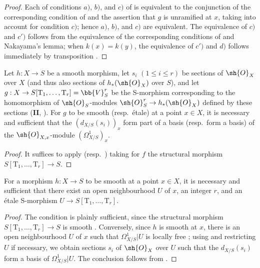\begin{proof}
Each of conditions $a)$, $b)$, and $c)$ of  is equivalent to the conjunction of the corresponding condition of  and the assertion that $g$ is unramified at $x$, taking  into account for condition $c)$; hence $a)$, $b)$, and $c)$ are equivalent.
The equivalence of $c)$ and $c')$ follows from the equivalence of the corresponding conditions of  and Nakayama's lemma; when $k(x)=k(y)$, the equivalence of $c')$ and $d)$ follows immediately by transposition .
\end{proof}

\begin{corollary}[17.11.3]
\label{IV.17.11.3}
Let $h:X\to S$ be a smooth morphism, let $s_i$ $(1\leq i\leq r)$ be sections of $\sh{O}_X$ over $X$ (and thus also sections of $h_*(\sh{O}_X)$ over $S$), and let
$g:X\to S[\mathrm{T}_1,\ldots,\mathrm{T}_r]=\bb{V}^r_S$
be the S-morphism corresponding to the homomorphism of $\sh{O}_S$-modules
$\sh{O}^r_S\to h_*(\sh{O}_X)$ defined by these sections (\textbf{II}, ).
For $g$ to be smooth (resp.\ \'etale) at a point $x\in X$, it is necessary and sufficient that the $(d_{X/S}(s_i))_x$ form part of a basis (resp.\ form a basis) of the $\sh{O}_{X,x}$-module $(\Omega^1_{X/S})_x$.
\end{corollary}

\begin{proof}
It suffices to apply  (resp.\ ) taking for $f$ the structural morphism $S[\mathrm{T}_1,\ldots,\mathrm{T}_r]\to S$.
\end{proof}

\begin{corollary}[17.11.4]
\label{IV.17.11.4}
For a morphism $h:X\to S$ to be smooth at a point $x\in X$, it is necessary and sufficient that there exist an open neighbourhood $U$ of $x$, an integer $r$, and an \'etale S-morphism
$U\to S[\mathrm{T}_1,\ldots,\mathrm{T}_r]$.
\end{corollary}

\begin{proof}
The condition is plainly sufficient, since the structural morphism $S[\mathrm{T}_1,\ldots,\mathrm{T}_r]\to S$ is smooth .
Conversely, since $h$ is smooth at $x$, there is an open neighbourhood $U$ of $x$ such that $\Omega^1_{X/S}|U$ is locally free ; using  and restricting $U$ if necessary, we obtain sections $s_i$ of $\sh{O}_X$ over $U$ such that the $d_{X/S}(s_i)$ form a basis of $\Omega^1_{X/S}|U$.
The conclusion follows from .
\end{proof}


